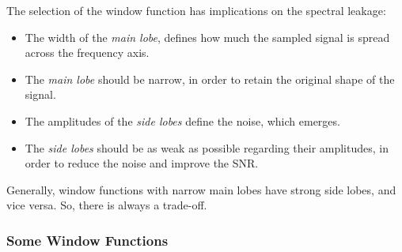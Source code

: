 \begin{refsection}
The selection of the window function has implications on the spectral leakage:
\begin{itemize}
	\item The width of the \emph{main lobe}, defines how much the sampled signal is spread across the frequency axis.
	\item The \emph{main lobe} should be narrow, in order to retain the original shape of the signal.
	\item The amplitudes of the \emph{side lobes} define the noise, which emerges.
	\item The \emph{side lobes} should be as weak as possible regarding their amplitudes, in order to reduce the noise and improve the \ac{SNR}.
\end{itemize}

\begin{fact}
	Generally, window functions with narrow main lobes have strong side lobes, and vice versa. So, there is always a trade-off.
\end{fact}

\begin{landscape}
	\subsubsection{Some Window Functions}
	

\end{landscape}
\end{refsection}
